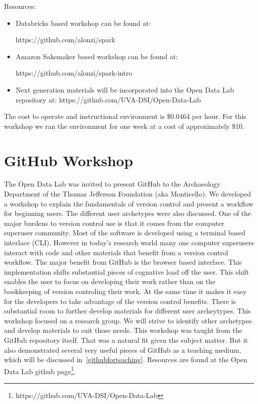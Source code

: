 Resources:
\begin{itemize}
\item Databricks based workshop can be found at: 

https://github.com/alonzi/spark
\item Amazon Sakemaker based workshop can be found at: 

https://github.com/alonzi/spark-intro
\item Next generation materials will be incorporated into the Open Data Lab repository at: https://github.com/UVA-DSI/Open-Data-Lab
\end{itemize}

The cost to operate and instructional environment is \$0.0464 per hour. For this workshop we ran the environment for one week at a cost of approximately \$10.

\section{GitHub Workshop}
\label{sec:git}
The Open Data Lab was invited to present GitHub to the Archaeology Department of the Thomas Jefferson Foundation (aka Monticello). We developed a workshop to explain the fundamentals of version control and present a workflow for beginning users. The different user archetypes were also discussed.
One of the major burdens to version control use is that it comes from the computer superuser community. Most of the software is developed using a terminal based interlace (CLI). However in today's research world many one computer superusers interact with code and other materials that benefit from a version control workflow.
The major benefit from GitHub is the browser based interface. This implementation shifts substantial pieces of cognative load off the user. This shift enables the user to focus on developing their work rather than on the bookkeeping of version controling their work. At the same time it makes it easy for the developers to take advantage of the version control benefits.
There is substantial room to further develop materials for different user archeytypes. This workshop focused on a research group. We will strive to identify other archetypes and develop materials to suit those needs.
This workshop was taught from the GitHub repository itself. That was a natural fit given the subject matter. But it also demonstrated several very useful pieces of GitHub as a teaching medium, which will be discussed in~\ref{githubforteaching}. Resources are found at the Open Data Lab github page\footnote{https://github.com/UVA-DSI/Open-Data-Lab}.

